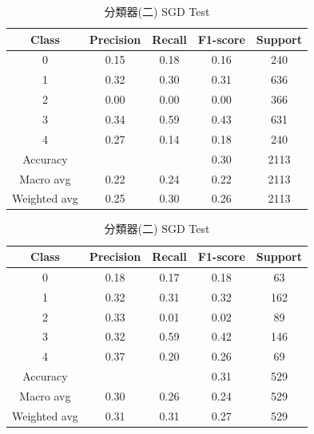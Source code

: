 \begin{enumerate}
\begin{enumerate}
                \begin{table}[H]
                \centering
                \scriptsize
                \begin{minipage}{0.48\textwidth}
                \centering
                \begin{tabular}{c|cccc}
                \hline
                Class & Precision & Recall & F1-score & Support \\
                \hline
                0 & 0.15 & 0.18 & 0.16 & 240 \\
                1 & 0.32 & 0.30 & 0.31 & 636 \\
                2 & 0.00 & 0.00 & 0.00 & 366 \\
                3 & 0.34 & 0.59 & 0.43 & 631 \\
                4 & 0.27 & 0.14 & 0.18 & 240 \\
                \hline
                Accuracy &       &       & 0.30 & 2113 \\
                Macro avg & 0.22 & 0.24 & 0.22 & 2113 \\
                Weighted avg & 0.25 & 0.30 & 0.26 & 2113 \\
                \hline
                \end{tabular}
                \caption{分類器(二) SGD Train}
                \label{tab:classifier_2_report_train_sgd_sgd_filtered}
                \end{minipage}%
                \hfill
                \begin{minipage}{0.48\textwidth}
                \centering
                \begin{tabular}{c|cccc}
                \hline
                Class & Precision & Recall & F1-score & Support \\
                \hline
                0 & 0.18 & 0.17 & 0.18 & 63 \\
                1 & 0.32 & 0.31 & 0.32 & 162 \\
                2 & 0.33 & 0.01 & 0.02 & 89 \\
                3 & 0.32 & 0.59 & 0.42 & 146 \\
                4 & 0.37 & 0.20 & 0.26 & 69 \\
                \hline
                Accuracy &       &       & 0.31 & 529 \\
                Macro avg & 0.30 & 0.26 & 0.24 & 529 \\
                Weighted avg & 0.31 & 0.31 & 0.27 & 529 \\
                \hline
                \end{tabular}
                \caption{分類器(二) SGD Test}
                \label{tab:classifier_2_report_test_sgd_sgd_filtered}
                \end{minipage}
                \end{table}



\end{enumerate}
\end{enumerate}

